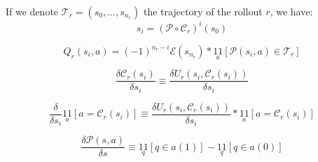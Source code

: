 If we denote $\mathcal{T}_r=(s_0, ..., s_{n_r})$ the trajectory of the rollout $r$, we have:
\begin{equation}
    s_i = \left(\mathcal{P}\circ \mathcal{C}_r\right)^{i}(s_0)
 \end{equation}

 \begin{equation}
    Q_r(s_i, a) = (-1)^{n_r-i}\mathcal{E}(s_{n_r}) * \underset{a}{1\!\!1}\left[\mathcal{P}(s_i,a) \in \mathcal{T}_r\right]
 \end{equation}

 \begin{equation}
    \frac{\delta \mathcal{C}_r(s_i)}{\delta s_i}\equiv \frac{\delta U_r(s_i, \mathcal{C}_r(s_i)) }{\delta s_i}
 \end{equation}

 \begin{equation}
    \frac{\delta}{\delta s_i}\underset{a}{1\!\!1} \left[a = \mathcal{C}_r(s_i)\right]\equiv \frac{\delta U_r(s_i, \mathcal{C}_r(s_i)) }{\delta s_i}  * \underset{a}{1\!\!1} \left[a = \mathcal{C}_r(s_i)\right]
 \end{equation}

 \begin{equation}
    \frac{\delta \mathcal{P}(s, a)}{\delta s}\equiv \underset{q}{1\!\!1}\left[q \in a(1)\right] - \underset{q}{1\!\!1}\left[q \in a(0)\right]
 \end{equation}
